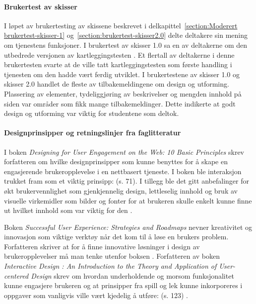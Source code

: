 \paragraph{Brukertest av skisser}
I løpet av brukertesting av skissene beskrevet i delkapittel~\ref{section:Moderert brukertest-skisser-1} og~\ref{section:brukertest-skisser2.0} delte deltakere sin mening om tjenestens funksjoner. I brukertest av skisser 1.0 sa en av deltakerne om den utbedrede versjonen av kartleggingstesten . Et flertall av deltakerne i denne brukertesten svarte at de ville tatt kartleggingstesten som første handling i tjenesten om den hadde vært ferdig utviklet. I brukertestene av skisser 1.0 og skisser 2.0 handlet de fleste av tilbakemeldingene om design og utforming. Plassering av elementer, tydeliggjøring av beskrivelser og mengden innhold på siden var områder som fikk mange tilbakemeldinger. Dette indikerte at godt design og utforming var viktig for studentene som deltok.

\paragraph{Designprinsipper og retningslinjer fra faglitteratur}
I boken {\em Designing for User Engagement on the Web: 10 Basic Principles} skrev forfatteren om hvilke designprinsipper som kunne benyttes for å skape en engasjerende brukeropplevelse i en nettbasert tjeneste. I boken ble interaksjon trukket fram som et viktig prinsipp:  (s. 71). I tillegg ble det gitt anbefalinger for økt brukervennlighet som gjenkjennelig design, lettleselig innhold og bruk av visuelle virkemidler som bilder og fonter for at brukeren skulle enkelt kunne finne ut hvilket innhold som var viktig for den \cite{ENGAGEMENT-WEB:17}. 

Boken {\em Successful User Experience: Strategies and Roadmaps} nevner kreativitet og innovasjon som viktige verktøy når det kom til å løse en brukers problem. Forfatteren skriver at for å finne innovative løsninger i design av brukeropplevelser må man tenke utenfor boksen \cite{SUCCESSFUL-UX:18}. Forfatteren av boken {\em Interactive Design : An Introduction to the Theory and Application of User-centered Design} skrev om hvordan underholdende og morsom funksjonalitet kunne engasjere brukeren og at prinsipper fra spill og lek kunne inkorporeres i oppgaver som vanligvis ville vært kjedelig å utføre:  (s. 123) \cite{INTERACTIVE-DESIGN:19}.

